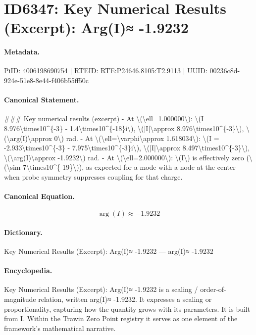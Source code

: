 \section*{ID6347: Key Numerical Results (Excerpt): Arg(I)≈ -1.9232}
\paragraph{Metadata.}
PiID: 4006198690754 | RTEID: RTE:P24646.8105:T2.9113 | UUID: 00236c8d-924e-51e8-8e44-f406b55ff50c

\paragraph{Canonical Statement.}
\#\#\# Key numerical results (excerpt) - At \textbackslash{}(\textbackslash{}ell=1.000000\textbackslash{}): \textbackslash{}(I = 8.976\textbackslash{}times10\textasciicircum{}\{-3\} - 1.4\textbackslash{}times10\textasciicircum{}\{-18\}i\textbackslash{}), \textbackslash{}(|I|\textbackslash{}approx 8.976\textbackslash{}times10\textasciicircum{}\{-3\}\textbackslash{}), \textbackslash{}(\textbackslash{}arg(I)\textbackslash{}approx 0\textbackslash{}) rad. - At \textbackslash{}(\textbackslash{}ell=\textbackslash{}varphi\textbackslash{}approx 1.618034\textbackslash{}): \textbackslash{}(I = -2.933\textbackslash{}times10\textasciicircum{}\{-3\} - 7.975\textbackslash{}times10\textasciicircum{}\{-3\}i\textbackslash{}), \textbackslash{}(|I|\textbackslash{}approx 8.497\textbackslash{}times10\textasciicircum{}\{-3\}\textbackslash{}), \textbackslash{}(\textbackslash{}arg(I)\textbackslash{}approx -1.9232\textbackslash{}) rad. - At \textbackslash{}(\textbackslash{}ell=2.000000\textbackslash{}): \textbackslash{}(I\textbackslash{}) is effectively zero (\textbackslash{}(\textbackslash{}sim 7\textbackslash{}times10\textasciicircum{}\{-19\}\textbackslash{})), as expected for a mode with a node at the center when probe symmetry suppresses coupling for that charge.

\paragraph{Canonical Equation.}
\[
\arg(I)\approx -1.9232
\]

\paragraph{Dictionary.}
Key Numerical Results (Excerpt): Arg(I)≈ -1.9232 — arg(I)≈ -1.9232

\paragraph{Encyclopedia.}
Key Numerical Results (Excerpt): Arg(I)≈ -1.9232 is a scaling / order-of-magnitude relation, written arg(I)≈ -1.9232. It expresses a scaling or proportionality, capturing how the quantity grows with its parameters. It is built from I. Within the Trawin Zero Point registry it serves as one element of the framework's mathematical narrative.
